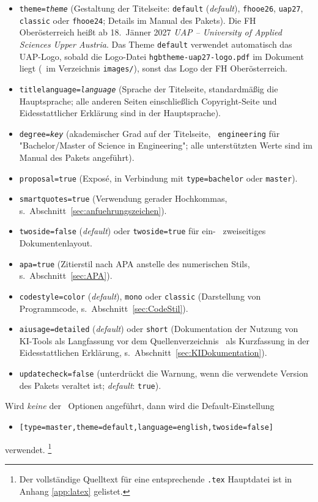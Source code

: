 \begin{itemize}
	\item[] \texttt{theme=\emph{theme}} (Gestaltung der Titelseite: \texttt{default}
		(\emph{default}), \texttt{fhooe26}, \texttt{uap27}, \texttt{classic} oder
		\texttt{fhooe24}; Details im Manual des Pakets). Die FH Oberösterreich heißt
		ab 18.~Jänner 2027 \emph{UAP -- University of Applied Sciences Upper
		Austria}. Das Theme \texttt{default} verwendet automatisch das UAP-Logo,
		sobald die Logo-Datei \nolinkurl{hgbtheme-uap27-logo.pdf} im Dokument
		liegt (\zB\ im Verzeichnis \nolinkurl{images/}), sonst das Logo der FH
		Oberösterreich.
	\item[] \texttt{titlelanguage=\emph{language}} (Sprache der Titelseite,
		standardmäßig die Hauptsprache; alle anderen Seiten einschließlich
		Copyright-Seite und Eidesstattlicher Erklärung sind in der Hauptsprache).
	\item[] \texttt{degree=\emph{key}} (akademischer Grad auf der Titelseite, \zB\
		\texttt{engineering} für "Bachelor/Master of Science in Engineering"; alle
		unterstützten Werte sind im Manual des Pakets angeführt).
	\item[] \texttt{proposal=true} (Exposé, in Verbindung mit \texttt{type=bachelor} 
		oder \texttt{master}).
	\item[] \texttt{smartquotes=true} (Verwendung gerader Hochkommas,
		s.\ Abschnitt~\ref{sec:anfuehrungszeichen}).
	\item[] \texttt{twoside=false} (\emph{default}) oder \texttt{twoside=true} für 
		ein- \bzw\ zweiseitiges Dokumentenlayout.
	\item[] \texttt{apa=true} (Zitierstil nach APA anstelle des numerischen Stils,
		s.\ Abschnitt~\ref{sec:APA}).
	\item[] \texttt{codestyle=color} (\emph{default}), \texttt{mono} oder \texttt{classic}
		(Darstellung von Programmcode, s.\ Abschnitt~\ref{sec:CodeStil}).
	\item[] \texttt{aiusage=detailed} (\emph{default}) oder \texttt{short}
		(Dokumentation der Nutzung von KI-Tools als Langfassung vor dem Quellenverzeichnis
		\bzw\ als Kurzfassung in der Eidesstattlichen Erklärung,
		s.\ Abschnitt~\ref{sec:KIDokumentation}).
	\item[] \texttt{updatecheck=false} (unterdrückt die Warnung, wenn die verwendete
		Version des Pakets veraltet ist; \emph{default}: \texttt{true}).
\end{itemize}
%
Wird \emph{keine} der \oa\ Optionen angeführt, dann wird die Default-Einstellung
\begin{itemize}
	\item[] \texttt{[type=master,theme=default,language=english,twoside=false]}
\end{itemize}
verwendet.%
\footnote{Der vollständige Quelltext für eine entsprechende
\texttt{.tex} Hauptdatei ist in Anhang \ref{app:latex} gelistet.}

